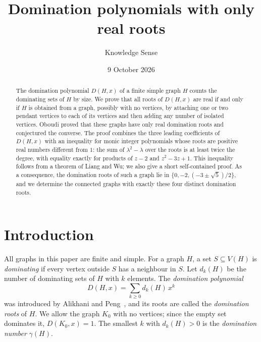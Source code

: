 \documentclass{amsart}
\theoremstyle{definition}
\theoremstyle{remark}
\numberwithin{equation}{section}
\begin{document}
\title{Domination polynomials with only real roots}

\author{Knowledge Sense}
\address{Knowledge Sense}

\date{9 October 2026}



\begin{abstract}
The domination polynomial $D(H,x)$ of a finite simple graph $H$ counts the dominating sets of $H$ by size. We prove that all roots of $D(H,x)$ are real if and only if $H$ is obtained from a graph, possibly with no vertices, by attaching one or two pendant vertices to each of its vertices and then adding any number of isolated vertices. Oboudi proved that these graphs have only real domination roots and conjectured the converse. The proof combines the three leading coefficients of $D(H,x)$ with an inequality for monic integer polynomials whose roots are positive real numbers different from $1$: the sum of $\lambda^2-\lambda$ over the roots is at least twice the degree, with equality exactly for products of $z-2$ and $z^2-3z+1$. This inequality follows from a theorem of Liang and Wu; we also give a short self-contained proof. As a consequence, the domination roots of such a graph lie in $\{0,-2,(-3\pm\sqrt5)/2\}$, and we determine the connected graphs with exactly these four distinct domination roots.
\end{abstract}

\maketitle

\section{Introduction}

All graphs in this paper are finite and simple. For a graph $H$, a set $S\subseteq V(H)$ is \emph{dominating} if every vertex outside $S$ has a neighbour in $S$. Let $d_k(H)$ be the number of dominating sets of $H$ with $k$ elements. The \emph{domination polynomial}
\[
D(H,x)=\sum_{k\ge 0} d_k(H)\,x^k
\]
was introduced by Alikhani and Peng~\cite{AP14}, and its roots are called the \emph{domination roots} of $H$. We allow the graph $K_0$ with no vertices; since the empty set dominates it, $D(K_0,x)=1$. The smallest $k$ with $d_k(H)>0$ is the \emph{domination number} $\gamma(H)$.
\end{document}
